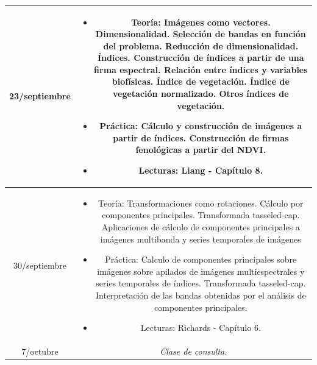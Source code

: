 \documentclass[11pt]{article}
\begin{document}
\begin{longtable}[h!]{| c | c | }
\hline
23/septiembre & \begin{minipage}{.65\textwidth}
\begin{itemize} 
    \vspace{1mm}
	\item Teoría: Imágenes como vectores. Dimensionalidad. Selección de bandas en función del problema. Reducción de dimensionalidad. Índices. Construcción de índices a partir de una firma espectral. Relación entre índices y variables biofísicas. Índice de vegetación. Índice de vegetación normalizado. Otros índices de vegetación.
  \item Práctica: Cálculo y construcción de imágenes a partir de índices. Construcción de firmas fenológicas a partir del NDVI.
	\item Lecturas: Liang - Capítulo 8.
    \vspace{1mm}
\end{itemize}
\end{minipage} \\


\hline
30/septiembre & \begin{minipage}{.65\textwidth}
\begin{itemize} 
    \vspace{1mm}
	\item Teoría: Transformaciones como rotaciones. Cálculo por componentes principales. Transformada tasseled-cap. Aplicaciones de cálculo de componentes principales a imágenes multibanda y series temporales de imágenes
  \item Práctica: Calculo de componentes principales sobre imágenes sobre apilados de imágenes multiespectrales y series temporales de índices. Transformada tasseled-cap. Interpretación de las bandas obtenidas por el análisis de componentes principales.
	\item Lecturas: Richards - Capítulo 6. 
    \vspace{1mm}
\end{itemize}
\end{minipage} \\

\hline
7/octubre & \begin{minipage}{.65\textwidth}
    \vspace{1mm}
\emph{Clase de consulta.}
    \vspace{1mm}
\end{minipage} \\


\end{longtable}
\end{document}
